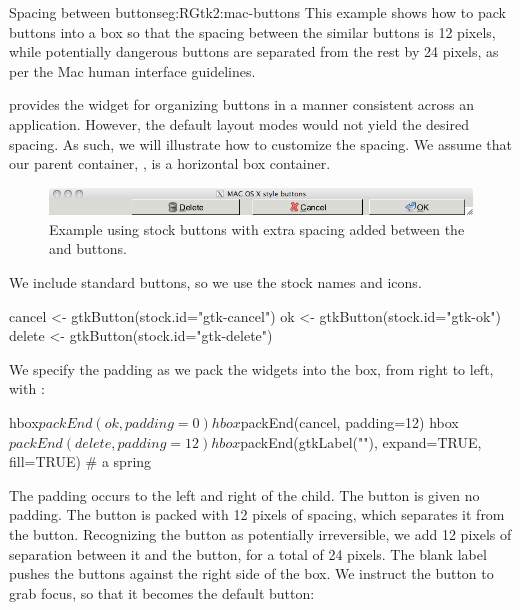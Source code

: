 \begin{example}{Spacing between buttons}{eg:RGtk2:mac-buttons}
This example shows how to pack buttons into a box so that the spacing
between the similar buttons is 12 pixels, while potentially dangerous
buttons are separated from the rest by 24 pixels, as per the Mac human
interface guidelines.  

\GTK\/ provides the widget  for organizing
buttons in a manner consistent across an application. However, the
default layout modes would not yield the desired spacing. As such, we
will illustrate how to customize the spacing.  We assume that our
parent container, , is a horizontal box container.


\begin{figure}
  \centering
  \includegraphics[width=.85\textwidth]{ex-RGtk2-mac-buttons}
  \caption{Example using stock buttons with extra spacing added between the  and  buttons.}
  \label{fig:ex-RGtk2-mac-buttons}
\end{figure}

We include standard buttons, so we use the stock names and icons.
\begin{Schunk}
\begin{Sinput}
 cancel <- gtkButton(stock.id="gtk-cancel")
 ok <- gtkButton(stock.id="gtk-ok")
 delete <- gtkButton(stock.id="gtk-delete")
\end{Sinput}
\end{Schunk}

We specify the padding as we pack the widgets into the box, from right
to left, with :
\begin{Schunk}
\begin{Sinput}
 hbox$packEnd(ok, padding=0)
 hbox$packEnd(cancel, padding=12)
 hbox$packEnd(delete, padding=12)
 hbox$packEnd(gtkLabel(""), expand=TRUE, fill=TRUE) # a spring
\end{Sinput}
\end{Schunk}
%
The padding occurs to the left and right of the child.  The 
button is given no padding. The  button is packed with 12
pixels of spacing, which separates it from the 
button. Recognizing the  button as potentially
irreversible, we add 12 pixels of separation between it and the
 button, for a total of 24 pixels. The blank label pushes
the buttons against the right side of the box.  We instruct the
 button to grab focus, so that it becomes the default
button:
\begin{Schunk}
\end{Schunk}






\end{example}

